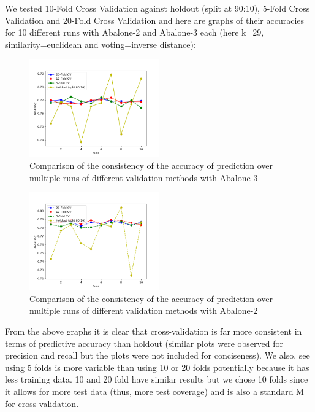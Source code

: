 We tested 10-Fold Cross Validation against holdout (split at 90:10), 5-Fold Cross Validation and 20-Fold Cross Validation and here are graphs of their accuracies for 10 different runs with Abalone-2 and Abalone-3 each (here k=29, similarity=euclidean and voting=inverse distance):



\begin{figure}[!htb]
\centering

\includegraphics[width=0.5\textwidth]{consistency_comparison_3.png}
\caption{Comparison of the consistency of the accuracy of prediction over multiple runs of different validation methods with Abalone-3}
\end{figure}

\begin{figure}[!htb]
\centering

\includegraphics[width=0.5\textwidth]{consistency_comparison_2.png}
\caption{Comparison of the consistency of the accuracy of prediction over multiple runs of different validation methods with Abalone-2}
\end{figure}


From the above graphs it is clear that cross-validation is far more consistent in terms of predictive accuracy than holdout (similar plots were observed for precision and recall but the plots were not included for conciseness). We also, see using 5 folds is more variable than using 10 or 20 folds potentially because it has less training data. 10 and 20 fold have similar results but we chose 10 folds since it allows for more test data (thus, more test coverage) and is also a standard M for cross validation. 


